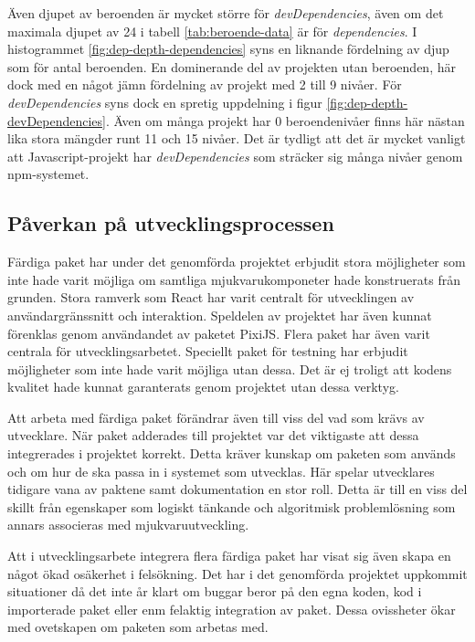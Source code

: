 Även djupet av beroenden är mycket större för \textit{devDependencies}, även om det maximala djupet av 24 i tabell \ref{tab:beroende-data} är för \textit{dependencies}. I histogrammet \ref{fig:dep-depth-dependencies} syns en liknande fördelning av djup som för antal beroenden. En dominerande del av projekten utan beroenden, här dock med en något jämn fördelning av projekt med 2 till 9 nivåer. För \textit{devDependencies} syns dock en spretig uppdelning i figur \ref{fig:dep-depth-devDependencies}. Även om många projekt har 0 beroendenivåer finns här nästan lika stora mängder runt 11 och 15 nivåer. Det är tydligt att det är mycket vanligt att Javascript-projekt har  \textit{devDependencies} som sträcker sig många nivåer genom npm-systemet.

\subsection{Påverkan på utvecklingsprocessen}

Färdiga paket har under det genomförda projektet erbjudit stora möjligheter som inte hade varit möjliga om samtliga mjukvarukomponeter hade konstruerats från grunden. Stora ramverk som React har varit centralt för utvecklingen av användargränssnitt och interaktion. Speldelen av projektet har även kunnat förenklas genom användandet av paketet PixiJS. Flera paket har även varit centrala för utvecklingsarbetet. Speciellt paket för testning har erbjudit möjligheter som inte hade varit möjliga utan dessa. Det är ej troligt att kodens kvalitet hade kunnat garanterats genom projektet utan dessa verktyg.

Att arbeta med färdiga paket förändrar även till viss del vad som krävs av utvecklare. När paket adderades till projektet var det viktigaste att dessa integrerades i projektet korrekt. Detta kräver kunskap om paketen som används och om hur de ska passa in i systemet som utvecklas. Här spelar utvecklares tidigare vana av paktene samt dokumentation en stor roll. Detta är till en viss del skillt från egenskaper som logiskt tänkande och algoritmisk problemlösning som annars associeras med mjukvaruutveckling.

Att i utvecklingsarbete integrera flera färdiga paket har visat sig även skapa en något ökad osäkerhet i felsökning. Det har i det genomförda projektet uppkommit situationer då det inte år klart om buggar beror på den egna koden, kod i importerade paket eller enm felaktig integration av paket. Dessa ovissheter ökar med ovetskapen om paketen som arbetas med.

